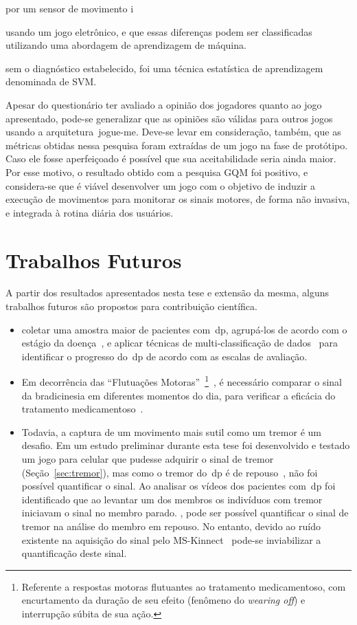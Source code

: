por um sensor de movimento i

usando um jogo eletrônico, e que essas diferenças podem ser classificadas utilizando uma
abordagem de aprendizagem de máquina.

sem o diagnóstico estabelecido, foi uma técnica estatística
de aprendizagem denominada de SVM. 


Apesar do questionário ter avaliado a opinião dos jogadores quanto ao jogo apresentado, pode-se generalizar que as opiniões são válidas para outros jogos usando a arquitetura~\ac{jogue-me}. Deve-se levar em consideração, também, que as métricas obtidas nessa pesquisa foram extraídas de um jogo na fase de protótipo. Caso ele fosse aperfeiçoado é possível que sua aceitabilidade seria ainda maior. Por esse motivo, o resultado obtido com a pesquisa GQM foi positivo, e considera-se que é viável desenvolver um jogo com o objetivo de induzir a execução de movimentos para monitorar os sinais motores, de forma não invasiva, e integrada à rotina diária dos usuários.


\section{Trabalhos Futuros}\label{section:trabalhos_futuros}
A partir dos resultados apresentados nesta tese e extensão da mesma, alguns trabalhos futuros são propostos para contribuição científica.

\begin{itemize}
	\item coletar uma amostra maior de pacientes com~\ac{dp}, agrupá-los de acordo com o estágio da doença~\cite{goul05}, e aplicar técnicas de multi-classificação de dados~\cite{multisvm2011} para identificar o progresso do~\ac{dp} de acordo com as escalas de avaliação.
	\item Em decorrência das ``Flutuações Motoras''~\footnote{Referente a respostas motoras flutuantes ao tratamento medicamentoso, com encurtamento da duração de seu efeito (fenômeno do \textit{wearing off}) e interrupção súbita de sua ação.}~\cite{protpar010}, é necessário comparar o sinal da bradicinesia em diferentes momentos do dia, para verificar a eficácia do tratamento medicamentoso~\cite{protpar010}. 
	\item Todavia, a captura de um movimento mais sutil como um tremor é um desafio. Em um estudo preliminar durante esta tese foi desenvolvido e testado um jogo para celular que pudesse adquirir o sinal de tremor (Seção~\ref{sec:tremor}), mas como o tremor do~\ac{dp} é de repouso~\cite{protpar010}, não foi possível quantificar o sinal. Ao analisar os vídeos dos pacientes com~\ac{dp} foi identificado que ao levantar um dos membros os indivíduos com tremor iniciavam o sinal no membro parado. , pode ser possível quantificar o sinal de tremor na análise do membro em repouso. No entanto, devido ao ruído existente na aquisição do sinal pelo MS-Kinnect~\cite{kinnect2013} pode-se inviabilizar a quantificação deste sinal.
\end{itemize}


